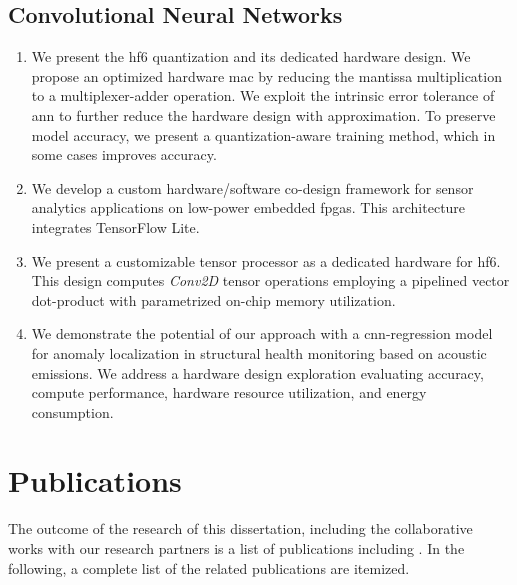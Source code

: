 \subsection{Convolutional Neural Networks}
\begin{enumerate}
	\item
	
	We present the \gls{hf6} quantization and its dedicated hardware design. We propose an optimized hardware \gls{mac} by reducing the mantissa multiplication to a multiplexer-adder operation. We exploit the intrinsic error tolerance of \gls{ann} to further reduce the hardware design with approximation. To preserve model accuracy, we present a quantization-aware training method, which in some cases improves accuracy.
	
	\item We develop a custom hardware/software co-design framework for sensor analytics applications on low-power embedded \gls{fpga}s. This architecture integrates TensorFlow Lite.
	\item We present a customizable tensor processor as a dedicated hardware for \gls{hf6}. This design computes \emph{Conv2D} tensor operations employing a pipelined vector dot-product with parametrized on-chip memory utilization.
	\item We demonstrate the potential of our approach with a \gls{cnn}-regression model for anomaly localization in structural health monitoring based on acoustic emissions. We address a hardware design exploration evaluating accuracy, compute performance, hardware resource utilization, and energy consumption.
\end{enumerate}

\section{Publications}
The outcome of the research of this dissertation, including the collaborative works with our research partners is a list of publications including \cite{nevarez2020accelerator, nevarez2021accelerating, yu2020taac}. In the following, a complete list of the related publications are itemized.

